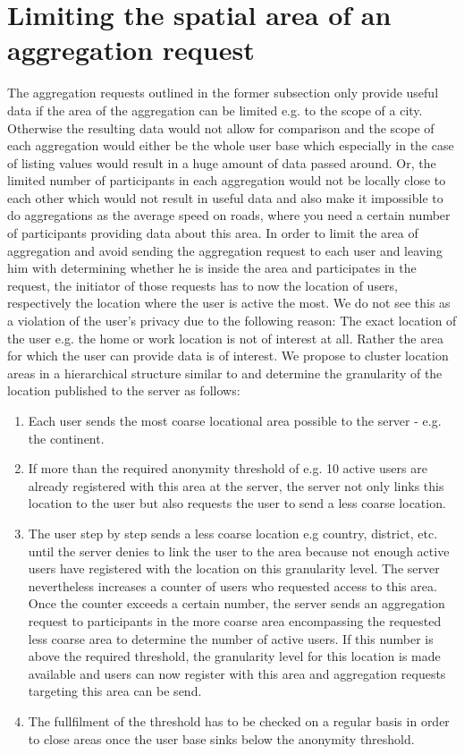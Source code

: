  \section{Limiting the spatial area of an aggregation request}
 The aggregation requests outlined in the former subsection only provide useful data if the area of the aggregation can be limited e.g. to the scope of a city. Otherwise the resulting data would not allow for comparison and the scope of each aggregation would either be the whole user base which especially in the case of listing values would result in a huge amount of data passed around. Or, the limited number of participants in each aggregation would not be locally close to each other which would not result in useful data and also make it impossible to do aggregations as the average speed on roads, where you need a certain number of participants providing data about this area. 
 In order to limit the area of aggregation and avoid sending the aggregation request to each user and leaving him with determining whether he is inside the area and participates in the request, the initiator of those requests has to now the location of users, respectively the location where the user is active the most.
 We do not see this as a violation of the user's privacy due to the following reason: The exact location of the user e.g. the home or work location is not of interest at all. Rather the area for which the user can provide data is of interest. We propose to cluster location areas in a hierarchical structure similar to \parencite{casper} and determine the granularity of the location published to the server as follows:
\begin{enumerate}
	\item Each user sends the most coarse locational area possible to the server - e.g. the continent.
	\item If more than the required anonymity threshold of e.g. 10 active users are already registered with this area at the server, the server not only links this location to the user but also requests the user to send a less coarse location.
	\item The user step by step sends a less coarse location e.g country, district, etc. until the server denies to link the user to the area because not enough active users have registered with the location on this granularity level. The server nevertheless increases a counter of users who requested access to this area. Once the counter exceeds a certain number, the server sends an aggregation request to participants in the more coarse area encompassing the requested less coarse area to determine the number of active users. If this number is above the required threshold, the granularity level for this location is made available and users can now register with this area and aggregation requests targeting this area can be send.
	\item The fullfilment of the threshold has to be checked on a regular basis in order to close areas once the user base sinks below the anonymity threshold.
\end{enumerate}
